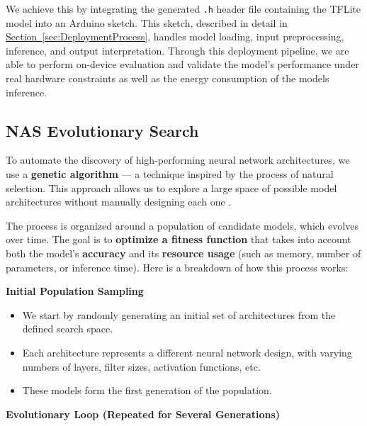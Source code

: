 We achieve this by integrating the generated \texttt{.h} header file containing the TFLite model into an Arduino sketch. This sketch, described in detail in \hyperref[sec:DeploymentProcess]{Section~\ref*{sec:DeploymentProcess}}, handles model loading, input preprocessing, inference, and output interpretation. Through this deployment pipeline, we are able to perform on-device evaluation and validate the model's performance under real hardware constraints as well as the energy consumption of the models inference.



\subsection{NAS Evolutionary Search}

To automate the discovery of high-performing neural network architectures, we use a \textbf{genetic algorithm} — a technique inspired by the process of natural selection. This approach allows us to explore a large space of possible model architectures without manually designing each one \cite{real2019regularized}.

The process is organized around a population of candidate models, which evolves over time. The goal is to \textbf{optimize a fitness function} that takes into account both the model’s \textbf{accuracy} and its \textbf{resource usage} (such as memory, number of parameters, or inference time).
Here is a breakdown of how this process works:

\textbf{Initial Population Sampling}
\begin{itemize}
    \item We start by randomly generating an initial set of architectures from the defined search space.
    \item Each architecture represents a different neural network design, with varying numbers of layers, filter sizes, activation functions, etc.
    \item These models form the first generation of the population.


\end{itemize}

\textbf{Evolutionary Loop (Repeated for Several Generations)}

